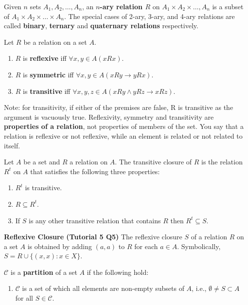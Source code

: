 \documentclass{article}
\begin{document}
\begin{description}
    \item[$n$-ary Relation] Given $n$ sets $A_{1}, A_{2}, \ldots, A_{n}$, an \textbf{$n$-ary relation $R$} on $A_{1} \times A_{2} \times \ldots, A_{n}$ is a subset of $A_{1} \times A_{2} \times \ldots \times A_{n}$. The special cases of 2-ary, 3-ary, and 4-ary relations are called \textbf{binary}, \textbf{ternary} and \textbf{quaternary relations} respectively. 
    \item[Reflexivity, Symmetry, Transitivity] Let $R$ be a relation on a set $A$. 
	\begin{enumerate}
		\item $R$ is \textbf{reflexive} iff $\forall x, y\in A(xRx)$. 
		\item $R$ is \textbf{symmetric} iff $\forall x, y\in A(xRy \to yRx)$. 
		\item $R$ is \textbf{transitive} iff $\forall x,y,z \in A(xRy \land yRz\to xRz)$.
	\end{enumerate}
	\item Note: for transitivity, if either of the premises are false, R is transitive as the argument is vacuously true. Reflexivity, symmetry and transitivity are \textbf{properties of a relation}, not properties of members of the set. You say that a relation is reflexive or not reflexive, while an element	is related or not related to itself. 
	\item[Transitive Closure]Let $A$ be a set and $R$ a relation on $A$. The transitive closure of $R$ is the relation $R^{t}$ on $A$ that satisfies the following three properties:	
	\begin{enumerate}
		\item $R^{t}$ is transitive.
		\item $R\subseteq R^{t}$.
		\item If $S$ is any other transitive relation that contains $R$ then $R^{t} \subseteq S$.
	\end{enumerate}
	\item \qquad \textbf{Reflexive Closure (Tutorial 5 Q5)} The reflexive closure $S$ of a relation $R$ on a set $A$ is obtained by adding $(a, a)$ to $R$ for each $a \in A$. Symbolically, $S = R\cup \{(x, x):x\in X\}$.
	\item[Partition] $\mathscr{C}$ is a \textbf{partition} of a set $A$ if the following hold: 
	\begin{enumerate}
		\item $\mathscr{C}$ is a set of which all elements are non-empty subsets of $A$, i.e., $\emptyset \neq S \subset A$ for all $S\in \mathscr{C}$. 

\end{enumerate}
\end{description}
\end{document}
